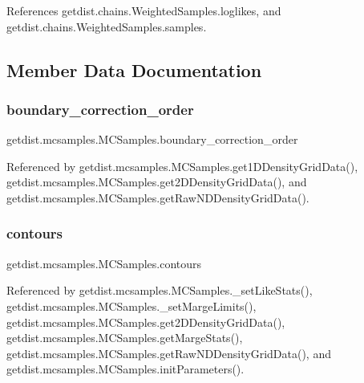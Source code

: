 References getdist.\+chains.\+Weighted\+Samples.\+loglikes, and getdist.\+chains.\+Weighted\+Samples.\+samples.



\subsection{Member Data Documentation}
\mbox{\label{classgetdist_1_1mcsamples_1_1MCSamples_a55037ee8a93c480245e6a21a2e039eec}} 
\subsubsection{\texorpdfstring{boundary\+\_\+correction\+\_\+order}{boundary\_correction\_order}}
{\footnotesize\ttfamily getdist.\+mcsamples.\+M\+C\+Samples.\+boundary\+\_\+correction\+\_\+order}



Referenced by getdist.\+mcsamples.\+M\+C\+Samples.\+get1\+D\+Density\+Grid\+Data(), getdist.\+mcsamples.\+M\+C\+Samples.\+get2\+D\+Density\+Grid\+Data(), and getdist.\+mcsamples.\+M\+C\+Samples.\+get\+Raw\+N\+D\+Density\+Grid\+Data().

\mbox{\label{classgetdist_1_1mcsamples_1_1MCSamples_aa08ea0e345f3e48afbb9555a65992e0e}} 
\subsubsection{\texorpdfstring{contours}{contours}}
{\footnotesize\ttfamily getdist.\+mcsamples.\+M\+C\+Samples.\+contours}



Referenced by getdist.\+mcsamples.\+M\+C\+Samples.\+\_\+set\+Like\+Stats(), getdist.\+mcsamples.\+M\+C\+Samples.\+\_\+set\+Marge\+Limits(), getdist.\+mcsamples.\+M\+C\+Samples.\+get2\+D\+Density\+Grid\+Data(), getdist.\+mcsamples.\+M\+C\+Samples.\+get\+Marge\+Stats(), getdist.\+mcsamples.\+M\+C\+Samples.\+get\+Raw\+N\+D\+Density\+Grid\+Data(), and getdist.\+mcsamples.\+M\+C\+Samples.\+init\+Parameters().

